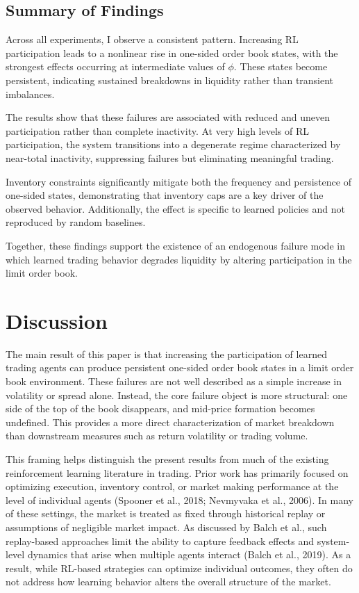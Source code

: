 \documentclass[11pt]{article}
\begin{document}
\FloatBarrier

\subsection{Summary of Findings}

Across all experiments, I observe a consistent pattern. Increasing RL participation leads to a nonlinear rise in one-sided order book states, with the strongest effects occurring at intermediate values of $\phi$. These states become persistent, indicating sustained breakdowns in liquidity rather than transient imbalances.

The results show that these failures are associated with reduced and uneven participation rather than complete inactivity. At very high levels of RL participation, the system transitions into a degenerate regime characterized by near-total inactivity, suppressing failures but eliminating meaningful trading.

Inventory constraints significantly mitigate both the frequency and persistence of one-sided states, demonstrating that inventory caps are a key driver of the observed behavior. Additionally, the effect is specific to learned policies and not reproduced by random baselines.

Together, these findings support the existence of an endogenous failure mode in which learned trading behavior degrades liquidity by altering participation in the limit order book.

\section{Discussion}

The main result of this paper is that increasing the participation of learned trading agents can produce persistent one-sided order book states in a limit order book environment. These failures are not well described as a simple increase in volatility or spread alone. Instead, the core failure object is more structural: one side of the top of the book disappears, and mid-price formation becomes undefined. This provides a more direct characterization of market breakdown than downstream measures such as return volatility or trading volume.

This framing helps distinguish the present results from much of the existing reinforcement learning literature in trading. Prior work has primarily focused on optimizing execution, inventory control, or market making performance at the level of individual agents (Spooner et al., 2018; Nevmyvaka et al., 2006). In many of these settings, the market is treated as fixed through historical replay or assumptions of negligible market impact. As discussed by Balch et al., such replay-based approaches limit the ability to capture feedback effects and system-level dynamics that arise when multiple agents interact (Balch et al., 2019). As a result, while RL-based strategies can optimize individual outcomes, they often do not address how learning behavior alters the overall structure of the market.
\end{document}
